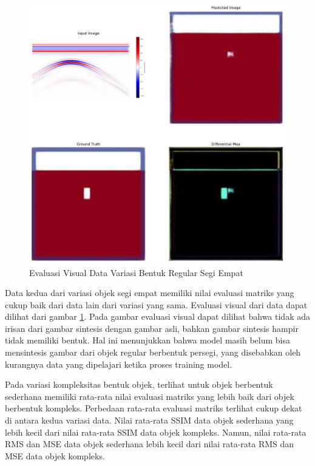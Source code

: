 \begin{figure}[ht]
  \centering
  \includegraphics[scale=0.15]{gambar/diffMapSegi4.jpg}
  \caption{Evaluasi Visual Data Variasi Bentuk Regular Segi Empat}
  \label{fig:diffmapsegi4}
\end{figure}

Data kedua dari variasi objek segi empat memiliki nilai evaluasi matriks yang cukup baik dari data lain dari variasi yang sama. 
Evaluasi visual dari data dapat dilihat dari gambar \ref{fig:diffmapsegi4}. 
Pada gambar evaluasi visual dapat dilihat bahwa tidak ada irisan dari gambar sintesis dengan gambar asli, bahkan gambar sintesis hampir tidak memiliki bentuk. 
Hal ini menunjukkan bahwa model masih belum bisa mensintesis gambar dari objek regular berbentuk persegi, yang disebabkan oleh kurangnya data yang dipelajari ketika proses training model.

Pada variasi kompleksitas bentuk objek, terlihat untuk objek berbentuk sederhana memiliki rata-rata nilai evaluasi matriks yang lebih baik dari objek berbentuk kompleks. 
Perbedaan rata-rata evaluasi matriks terlihat cukup dekat di antara kedua variasi data.  
Nilai rata-rata SSIM data objek sederhana yang lebih kecil dari nilai rata-rata SSIM data objek kompleks. 
Namun, nilai rata-rata RMS dan MSE data objek sederhana lebih kecil dari nilai rata-rata RMS dan MSE data objek kompleks. 

